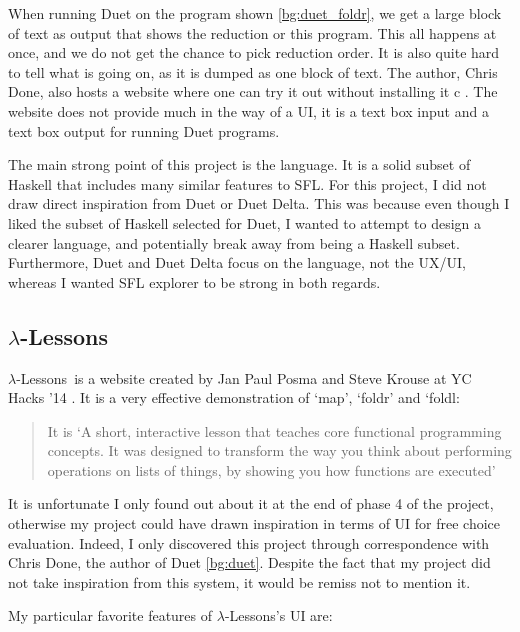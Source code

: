 \noindent When running Duet \cite{duet_hackage} on the program shown \ref{bg:duet_foldr}, we get a large block of text as output that shows the reduction or this program. This all happens at once, and we do not get the chance to pick reduction order. It is also quite hard to tell what is going on, as it is dumped as one block of text. The author, Chris Done, also hosts a website where one can try it out without installing it c \cite{duet_delta}. The website does not provide much in the way of a UI, it is a text box input and a text box output for running Duet programs.

\noindent The main strong point of this project is the language. It is a solid subset of Haskell that includes many similar features to SFL. For this project, I did not draw direct inspiration from Duet or Duet Delta. This was because even though I liked the subset of Haskell selected for Duet, I wanted to attempt to design a clearer language, and potentially break away from being a Haskell subset. Furthermore, Duet and Duet Delta focus on the language, not the UX/UI, whereas I wanted SFL explorer to be strong in both regards. 

\subsection{$\lambda$-Lessons}
\newcommand{\llessons}{$\lambda$-Lessons}
\label{bg:llessons}

\llessons\ is a website created by Jan Paul Posma and Steve Krouse at YC Hacks '14 \cite{lambdalessons}. It is a very effective demonstration of `map', `foldr' and `foldl:

\begin{quotation}
\noindent It is `A short, interactive lesson that teaches core functional programming concepts. It was designed to transform the way you think about performing operations on lists of things, by showing you how functions are executed' \cite{lambdalessons}
\end{quotation}

\noindent It is unfortunate I only found out about it at the end of phase 4 of the project, otherwise my project could have drawn inspiration in terms of UI for free choice evaluation. Indeed, I only discovered this project through correspondence with Chris Done, the author of Duet \ref{bg:duet}. Despite the fact that my project did not take inspiration from this system, it would be remiss not to mention it. 

My particular favorite features of \llessons's UI are:

